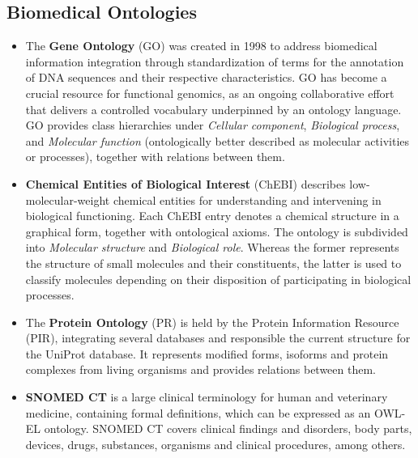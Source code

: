 \subsection{Biomedical Ontologies}
\label{sec:onto}
\begin{itemize}
	\item The \textbf{Gene Ontology} (GO) \citep{Gene2014a} was created in 1998 to address biomedical  information  integration through standardization of terms for the annotation of DNA sequences and their respective characteristics.  GO has become a crucial resource for functional genomics, as an ongoing collaborative effort that delivers a controlled vocabulary underpinned by an ontology language. GO provides class hierarchies under \textit{Cellular component}, \textit{Biological process}, and \textit{Molecular function} (ontologically better described as molecular activities or processes), together with relations between them.
	\item \textbf{Chemical Entities of Biological Interest} (ChEBI) \citep{Hastings2013} describes low-molecular-weight chemical entities for understanding and intervening in biological functioning. Each ChEBI entry denotes a chemical structure in a graphical form, together with ontological axioms. The ontology is subdivided into \textit{Molecular structure} and \textit{Biological role}. Whereas the former represents the structure of small molecules and their constituents, the latter is used to classify molecules depending on their disposition of participating in biological processes.
	\item The \textbf{Protein Ontology} (PR) \citep{Natale2014} is held by the Protein Information Resource (PIR), integrating several databases and responsible the current structure for the UniProt database. It represents modified forms, isoforms and protein complexes from living organisms and provides relations between them. 
	\item \textbf{SNOMED CT} \citep{IHTSDO2015} is a large clinical terminology for human and veterinary medicine, containing formal definitions, which can be expressed as an OWL-EL ontology. SNOMED CT covers clinical findings and disorders, body parts, devices, drugs, substances, organisms and clinical procedures, among others.  

\end{itemize}
